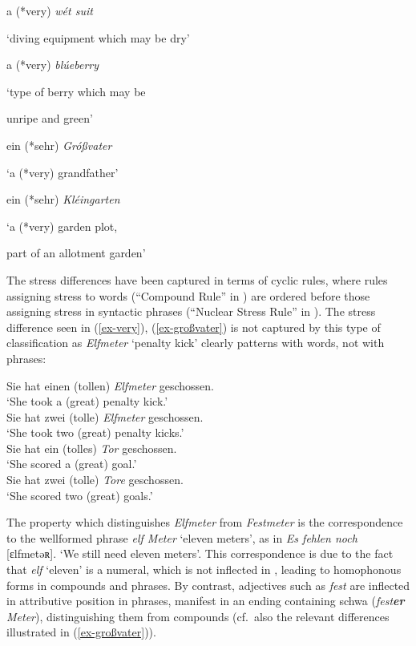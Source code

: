 \documentclass[output=paper
 ,nobabel
 ,draftmode
 ,colorlinks, citecolor=brown
]{langscibook}
\begin{document}
\settowidth{}
\ea\label{ex-very}
\ea a (*very) \emph{wét suit} 

`diving equipment which may be dry' 

\ex a (*very) \emph{blúeberry} 

`type of berry	which may be  

unripe and green'
\z

\ex\label{ex-großvater}
\ea ein (*sehr) \emph{Gróßvater} 

`a (*very) grandfather' 

\ex ein (*sehr) \emph{Kléingarten} 

`a (*very) garden plot, 

part of an allotment garden'
\z
\z

\noindent
The stress differences have been captured in terms of cyclic rules, where rules assigning stress to words (``Compound Rule'' in \citealp[17]{ChomskyHalle1968}) are ordered before those assigning stress in syntactic phrases (``Nuclear Stress Rule'' in \citealp[17]{ChomskyHalle1968}). The stress difference seen in (\ref{ex-very}), (\ref{ex-großvater}) is not captured by this type of classification as \emph{Elfmeter} `penalty kick' clearly patterns with words, not with phrases:

\eal\label{elfmeter}
\ex Sie hat einen (tollen) \emph{Elfmeter} geschossen. \\
`She took a (great) penalty kick.' \\

\ex Sie hat zwei (tolle) \emph{Elfmeter} geschossen. \\
	 `She took two (great) penalty kicks.' \\
\ex	Sie hat ein (tolles) \emph{Tor} geschossen. \\
	 `She scored a  (great) goal.' \\
\ex	Sie hat zwei (tolle) \emph{Tore} geschossen. \\
	 `She scored two (great) goals.'
\zl

\noindent
The property which distinguishes \emph{Elfmeter} from \emph{Festmeter} is the correspondence to the wellformed phrase \emph{elf Meter} `eleven meters', as in \emph{Es fehlen noch} [ɛlfmetəʀ]. `We still need eleven meters'. This correspondence is due to the fact that \emph{elf} `eleven' is a numeral, which is not inflected in , leading to homophonous forms in compounds and phrases. By contrast, adjectives such as \emph{fest} are inflected in attributive position in phrases, manifest in an ending containing schwa (\eg \emph{fest}\textbf{\emph{er}} \emph{Meter}), distinguishing them from compounds (cf.\ also the relevant differences illustrated in (\ref{ex-großvater})).
\end{document}
